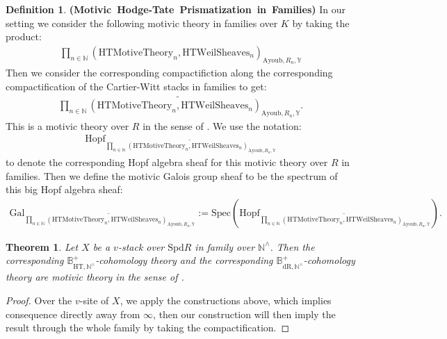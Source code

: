 \documentclass[12pt]{article}
\newtheorem{theorem}{Theorem}
\theoremstyle{definition}
\newtheorem{definition}{Definition}
\begin{document}
\begin{definition}  \mbox{\textbf{(Motivic Hodge-Tate Prismatization in Families)}}
In our setting we consider the following motivic theory in families over $K$ by taking the product:
\begin{align}
\prod_{n\in \mathbb{N}} (\mathrm{HTMotiveTheory}_{n}, \mathrm{HTWeilSheaves}_n)_{\mathrm{Ayoub}, R_n,\mathbb{Y}}
\end{align}
Then we consider the corresponding compactifiction along the corresponding compactification of the Cartier-Witt stacks in families to get:
\begin{align}
\widetilde{\prod_{n\in \mathbb{N}} (\mathrm{HTMotiveTheory}_{n}, \mathrm{HTWeilSheaves}_n)_{\mathrm{Ayoub}, R_n,\mathbb{Y}}}.
\end{align}
This is a motivic theory over $R$ in the sense of \cite{2A}. We use the notation:
\begin{align}
\mathrm{Hopf}_{\widetilde{\prod_{n\in \mathbb{N}} (\mathrm{HTMotiveTheory}_{n}, \mathrm{HTWeilSheaves}_n)_{\mathrm{Ayoub}, R_n,\mathbb{Y}}}}
\end{align}
to denote the corresponding Hopf algebra sheaf for this motivic theory over $R$ in families. Then we define the motivic Galois group sheaf to be the spectrum of this big Hopf algebra sheaf:
\begin{align}
\mathrm{Gal}_{\widetilde{\prod_{n\in \mathbb{N}} (\mathrm{HTMotiveTheory}_{n}, \mathrm{HTWeilSheaves}_n)_{\mathrm{Ayoub}, R_n,\mathbb{Y}}}}:= \mathrm{Spec}(\mathrm{Hopf}_{\widetilde{\prod_{n\in \mathbb{N}} (\mathrm{HTMotiveTheory}_{n}, \mathrm{HTWeilSheaves}_n)_{\mathrm{Ayoub}, R_n,\mathbb{Y}}}}).
\end{align}
\end{definition}


\begin{theorem}
Let $X$ be a $v$-stack over $\mathrm{Spd}R$ in family over $\mathbb{N}^\wedge$. Then the corresponding $\mathbb{B}_{\mathrm{HT},\mathbb{N}^\wedge}^+$-cohomology theory and the corresponding $\mathbb{B}_{\mathrm{dR},\mathbb{N}^\wedge}^+$-cohomology theory are motivic theory in the sense of \cite{2A}. 
\end{theorem}

\begin{proof}
Over the $v$-site of $X$, we apply the constructions above, which implies consequence directly away from $\infty$, then our construction will then imply the result through the whole family by taking the compactification.
\end{proof}
\end{document}
